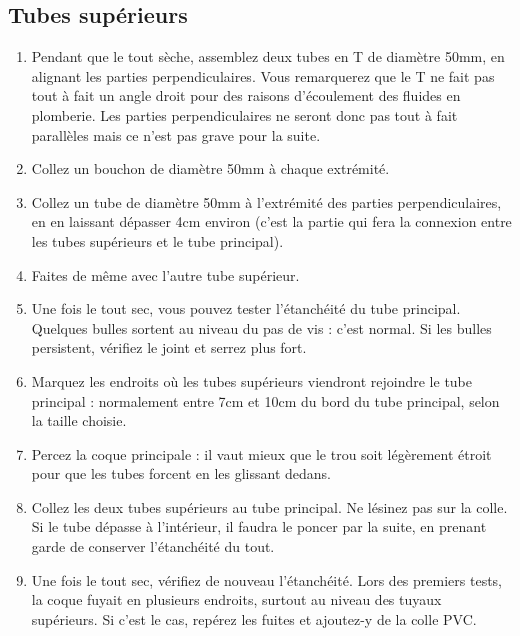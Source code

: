\documentclass[11pt,a4paper]{article}
\begin{document}
        \subsection{Tubes supérieurs}
          
          \begin{enumerate}
            \item Pendant que le tout sèche, assemblez deux tubes en T de diamètre 50mm, en alignant les parties perpendiculaires. Vous remarquerez que le T ne fait pas tout à fait un angle droit pour des raisons d'écoulement des fluides en plomberie. Les parties perpendiculaires ne seront donc pas tout à fait parallèles mais ce n'est pas grave pour la suite.
            
            \item Collez un bouchon de diamètre 50mm à chaque extrémité.
            
            \item Collez un tube de diamètre 50mm à l'extrémité des parties perpendiculaires, en en laissant dépasser 4cm environ (c'est la partie qui fera la connexion entre les tubes supérieurs et le tube principal).
            
            \item Faites de même avec l'autre tube supérieur.
            
            \item Une fois le tout sec, vous pouvez tester l'étanchéité du tube principal. Quelques bulles sortent au niveau du pas de vis : c'est normal. Si les bulles persistent, vérifiez le joint et serrez plus fort.
            
            \item Marquez les endroits où les tubes supérieurs viendront rejoindre le tube principal : normalement entre 7cm et 10cm du bord du tube principal,             selon la taille choisie.
            
            \item Percez la coque principale : il vaut mieux que le trou soit légèrement étroit pour que les tubes forcent en les glissant dedans.
            
            \item Collez les deux tubes supérieurs au tube principal. Ne lésinez pas sur la colle. Si le tube dépasse à l'intérieur, il faudra le poncer par la suite, en prenant garde de conserver l'étanchéité du tout.
            
            \item Une fois le tout sec, vérifiez de nouveau l'étanchéité. Lors des premiers tests, la coque fuyait en plusieurs endroits, surtout au niveau des tuyaux supérieurs. Si c'est le cas, repérez les fuites et ajoutez-y de la colle PVC.
          \end{enumerate}
          
\end{document}

